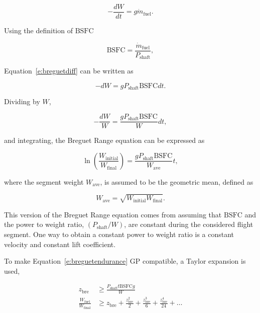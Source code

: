 \begin{equation}
    \label{e:breguetdiff}
    -\frac{dW}{dt} = g\dot{m}_{\text{fuel}}.
\end{equation}

Using the definition of $\text{BSFC}$

\begin{equation}
    \label{e:brBSFC}
    \text{BSFC} = \frac{\dot{m}_{\text{fuel}}}{P_{\text{shaft}}},
\end{equation}

Equation~\eqref{e:breguetdiff} can be written as

\begin{equation}
    \label{e:brdiff2}
    -dW = g P_{\text{shaft}} \text{BSFC} dt.
\end{equation}

Dividing by $W$,

\begin{equation}
    \label{e:brdiff2}
    -\frac{dW}{W} = \frac{g P_{\text{shaft}}\text{BSFC} }{W} dt,
\end{equation}

and integrating, the Breguet Range equation can be expressed as

\begin{equation}
    \label{e:be1}
    \ln{\left( \frac{W_{\text{initial}}}{W_{\text{final}}} \right)} = \frac{gP_{\text{shaft}}\text{BSFC}}{W_{\text{ave}}} t,
\end{equation}
 
where the segment weight $W_{\text{ave}}$, is assumed to be the geometric mean, defined as

\begin{equation}
    \label{e:gpmean}
    W_{\text{ave}} = \sqrt{W_{\text{initial}}W_{\text{final}}}.
\end{equation}

This version of the Breguet Range equation comes from assuming that $\text{BSFC}$ and the power to weight ratio, $(P_{\text{shaft}}/W)$, are constant during the considered flight segment. 
One way to obtain a constant power to weight ratio is a constant velocity and constant lift coefficient.\cite{br2}

    To make Equation~\eqref{e:breguetendurance} GP compatible, a Taylor expansion is used,\cite{hoburgthesis}

\begin{align}
    \label{e:brzbre}
    z_{\text{bre}} &\geq \frac{P_{\text{shaft}}t \text{BSFC} g}{W}\\
    \label{e:brtaylor}
    \frac{W_{\text{fuel}}}{W_\text{final}} &\geq z_{\text{bre}} + \frac{z_{\text{bre}}^2}{2} + \frac{z_{\text{bre}}^3}{6} + \frac{z_{\text{bre}}^4}{24} + \dots
\end{align}

